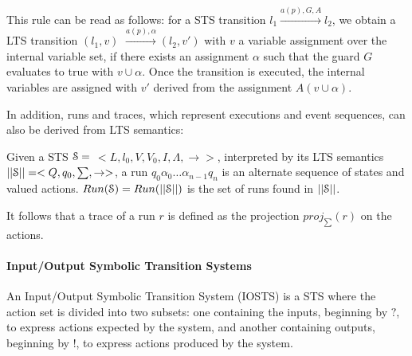 This rule can be read as follows: for a STS transition $l_1
\xrightarrow{a(p),G,A}l_2$, we obtain a LTS transition $(l_1,v)$
$\xrightarrow{a(p),\alpha} (l_2,v')$ with $v$ a variable
assignment over the internal variable set, if there exists an
assignment $\alpha$ such that the guard $G$ evaluates to true
with $v \cup \alpha$. Once the transition is executed, the
internal variables are assigned with $v'$ derived from the
assignment $A(v \cup \alpha)$.

In addition, runs and traces, which represent executions and
event sequences, can also be derived from LTS semantics:

\begin{definition}
    Given a STS $\EuScript{S}=$ $<L,l_0,V,V_0,I,\Lambda,
	\rightarrow>$, interpreted by its LTS semantics
	$||\EuScript{S}||=<Q,q_0,\sum,\rightarrow>$, a run $q_0
	\alpha_0 \dots \alpha_{n-1} q_n$ is an alternate sequence of states
    and valued actions. $Run(\EuScript{S})=Run(||\EuScript{S}||)$ is
	the set of runs found in $||\EuScript{S}||$.

    It follows that a trace of a run $r$ is defined as the
    projection $proj_{\sum}(r)$ on the actions.

	\label{def:runs-and-traces}
\end{definition}

\paragraph{Input/Output Symbolic Transition Systems}
\label{sec:definitions:iosts}

An Input/Output Symbolic Transition System (IOSTS) is a STS where
the action set is divided into two subsets: one containing the
inputs, beginning by $?$, to express actions expected by the
system, and another containing outputs, beginning by $!$, to
express actions produced by the system.

